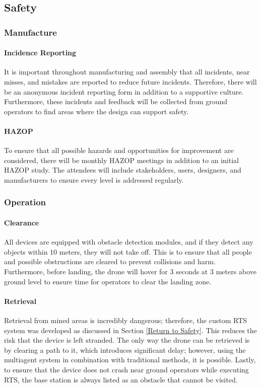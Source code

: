 \subsection{Safety}\label{sub_section:tgt_safety}
\subsubsection{Manufacture}\label{sub_sub_section:tgt_safety_manufacture}
\paragraph{Incidence Reporting}
It is important throughout manufacturing and assembly that all incidents, near misses, and mistakes are reported to reduce future incidents. Therefore, there will be an anonymous incident reporting form in addition to a supportive culture. Furthermore, these incidents and feedback will be collected from ground operators to find areas where the design can support safety.
\paragraph{\gls{HAZOP}}
To ensure that all possible hazards and opportunities for improvement are considered, there will be monthly \gls{HAZOP} meetings in addition to an initial \gls{HAZOP} study. The attendees will include stakeholders, users, designers, and manufacturers to ensure every level is addressed regularly.

\subsubsection{Operation}\label{sub_sub_section:tgt_safety_operation}
\paragraph{Clearance}
All devices are equipped with obstacle detection modules, and if they detect any objects within 10 meters, they will not take off. This is to ensure that all people and possible obstructions are cleared to prevent collisions and harm. Furthermore, before landing, the drone will hover for 3 seconds at 3 meters above ground level to ensure time for operators to clear the landing zone.
\paragraph{Retrieval}
Retrieval from mined areas is incredibly dangerous; therefore, the custom \gls{RTS} system was developed as discussed in Section \ref{Return to Safety}. This reduces the risk that the device is left stranded. The only way the drone can be retrieved is by clearing a path to it, which introduces significant delay; however, using the multiagent system in combination with traditional methods, it is possible. Lastly, to ensure that the device does not crash near ground operators while executing \gls{RTS}, the base station is always listed as an obstacle that cannot be visited.

